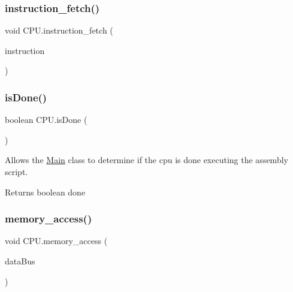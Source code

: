 \subsubsection{\texorpdfstring{instruction\+\_\+fetch()}{instruction\_fetch()}}
{\footnotesize\ttfamily void C\+P\+U.\+instruction\+\_\+fetch (\begin{DoxyParamCaption}\item[{String}]{instruction }\end{DoxyParamCaption})\hspace{0.3cm}{\ttfamily [private]}}

\mbox{\label{class_c_p_u_aef889eba6973e62664310a5ef8f9654d}} 
\subsubsection{\texorpdfstring{is\+Done()}{isDone()}}
{\footnotesize\ttfamily boolean C\+P\+U.\+is\+Done (\begin{DoxyParamCaption}{ }\end{DoxyParamCaption})\hspace{0.3cm}{\ttfamily [package]}}

Allows the \mbox{\hyperlink{class_main}{Main}} class to determine if the cpu is done executing the assembly script.

\begin{DoxyReturn}{Returns}
boolean done 
\end{DoxyReturn}
\mbox{\label{class_c_p_u_ab50af6d8dde2323a1ceea8c58e3ce5a8}} 
\subsubsection{\texorpdfstring{memory\+\_\+access()}{memory\_access()}}
{\footnotesize\ttfamily void C\+P\+U.\+memory\+\_\+access (\begin{DoxyParamCaption}\item[{\mbox{\hyperlink{class_data_bus}{Data\+Bus}}}]{data\+Bus }\end{DoxyParamCaption})\hspace{0.3cm}{\ttfamily [private]}}

\mbox{\label{class_c_p_u_a9926463b06331bffb789febcf3cd102f}} 
